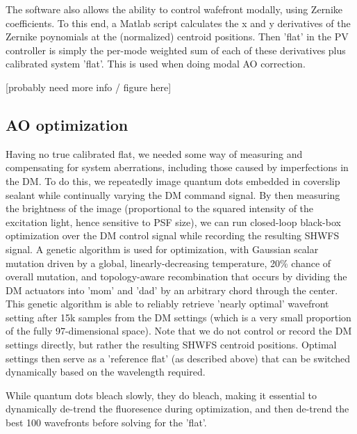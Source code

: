 \documentclass[a4paper,12pt]{article}
\begin{document}
The software also allows the ability to control wafefront modally, using Zernike coefficients.   To this end,   a Matlab script calculates the x and y derivatives of the Zernike poynomials at the (normalized) centroid positions.  Then 'flat' in the PV controller is simply the per-mode weighted sum of each of these derivatives plus calibrated system 'flat'.  This is used when doing modal AO correction.  

[probably need more info / figure here] 

\subsection {AO optimization}

Having no true calibrated flat, we needed some way of measuring and compensating for system aberrations, including those caused by imperfections in the DM.  To do this, we repeatedly image quantum dots embedded in coverslip sealant while continually varying the DM command signal.  By then measuring the brightness of the image (proportional to the squared intensity of the excitation light, hence sensitive to PSF size), we can run closed-loop black-box optimization over the DM control signal while recording the resulting SHWFS signal.  A genetic algorithm is used for optimization, with Gaussian scalar mutation driven by a global, linearly-decreasing temperature, 20\% chance of overall mutation, and topology-aware recombination that occurs by dividing the DM actuators into 'mom' and 'dad' by an arbitrary chord through the center.  This genetic algorithm is able to reliably retrieve 'nearly optimal' wavefront setting after 15k samples from the DM settings (which is a very small proportion of the fully 97-dimensional space).  Note that we do not control or record the DM settings directly, but rather the resulting SHWFS centroid positions.  Optimal settings then serve as a 'reference flat' (as described above) that can be switched dynamically based on the wavelength required.  

While quantum dots bleach slowly, they do bleach, making it essential to dynamically de-trend the fluoresence during optimization, and then de-trend the best 100 wavefronts before solving for the 'flat'.
\end{document}

